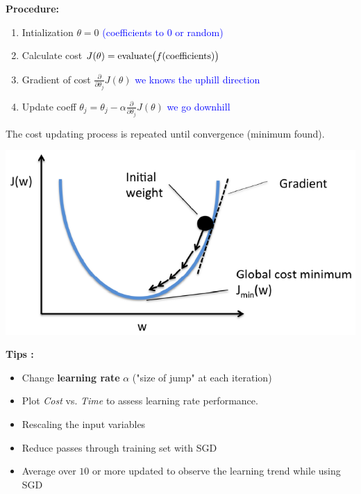 \documentclass[letterpaper, 10.5pt,landscape]{article}
\begin{document}
\begin{multicols*}{3}
\textbf{Procedure: }
\begin{enumerate}
    \item Intialization  \hspace{14pt} \(\theta = 0\) \textcolor{blue}{(coefficients to 0 or random)}
    \item Calculate cost  \hspace{5pt} \(J(\theta) = \text{evaluate\big($f$(coefficients)}\big)\)
    \item Gradient of cost \hspace{-2pt} $\frac{\partial}{\partial \theta_{j}} J(\theta)$ \textcolor{blue}{we knows the uphill direction} 
    \item Update coeff \hspace{12pt} $\theta_{j} = \theta_{j} - \alpha \frac{\partial}{\partial \theta_{j}} J(\theta)$ \textcolor{blue}{we go downhill}
\end{enumerate}
The cost updating process is repeated until convergence (minimum found). 
\vspace{-7pt}
\begin{center}
    \begin{minipage}{0.75\linewidth}
        \includegraphics[width=\textwidth]{figures/gradient_decent.PNG}
    \end{minipage}    
\end{center}
\vspace{-5pt}

\textbf{Tips : }
\vspace{-5pt}
\begin{itemize}
    \item Change \textbf{learning rate} $\alpha$ ("size of jump" at each iteration)
    \vspace{-3pt}
    \item Plot \textit{Cost} vs. \textit{Time} to assess learning rate performance. 
    \vspace{-3pt}
    \item Rescaling the input variables
    \vspace{-3pt}
    \item Reduce passes through training set with SGD
    \vspace{-3pt}
    \item Average over $10$ or more updated to observe the learning trend while using SGD
    \vspace{-3pt}
\end{itemize}




\end{multicols*}
\end{document}
